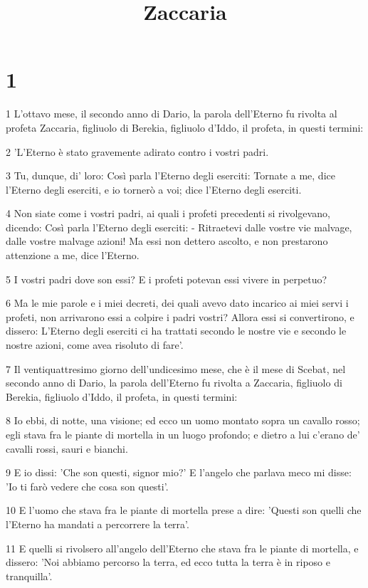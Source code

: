 

\title{Zaccaria}


\chapter{1}

\par 1 L'ottavo mese, il secondo anno di Dario, la parola dell'Eterno fu rivolta al profeta Zaccaria, figliuolo di Berekia, figliuolo d'Iddo, il profeta, in questi termini:
\par 2 'L'Eterno è stato gravemente adirato contro i vostri padri.
\par 3 Tu, dunque, di' loro: Così parla l'Eterno degli eserciti: Tornate a me, dice l'Eterno degli eserciti, e io tornerò a voi; dice l'Eterno degli eserciti.
\par 4 Non siate come i vostri padri, ai quali i profeti precedenti si rivolgevano, dicendo: Così parla l'Eterno degli eserciti: - Ritraetevi dalle vostre vie malvage, dalle vostre malvage azioni! Ma essi non dettero ascolto, e non prestarono attenzione a me, dice l'Eterno.
\par 5 I vostri padri dove son essi? E i profeti potevan essi vivere in perpetuo?
\par 6 Ma le mie parole e i miei decreti, dei quali avevo dato incarico ai miei servi i profeti, non arrivarono essi a colpire i padri vostri? Allora essi si convertirono, e dissero: L'Eterno degli eserciti ci ha trattati secondo le nostre vie e secondo le nostre azioni, come avea risoluto di fare'.
\par 7 Il ventiquattresimo giorno dell'undicesimo mese, che è il mese di Scebat, nel secondo anno di Dario, la parola dell'Eterno fu rivolta a Zaccaria, figliuolo di Berekia, figliuolo d'Iddo, il profeta, in questi termini:
\par 8 Io ebbi, di notte, una visione; ed ecco un uomo montato sopra un cavallo rosso; egli stava fra le piante di mortella in un luogo profondo; e dietro a lui c'erano de' cavalli rossi, sauri e bianchi.
\par 9 E io dissi: 'Che son questi, signor mio?' E l'angelo che parlava meco mi disse: 'Io ti farò vedere che cosa son questi'.
\par 10 E l'uomo che stava fra le piante di mortella prese a dire: 'Questi son quelli che l'Eterno ha mandati a percorrere la terra'.
\par 11 E quelli si rivolsero all'angelo dell'Eterno che stava fra le piante di mortella, e dissero: 'Noi abbiamo percorso la terra, ed ecco tutta la terra è in riposo e tranquilla'.
